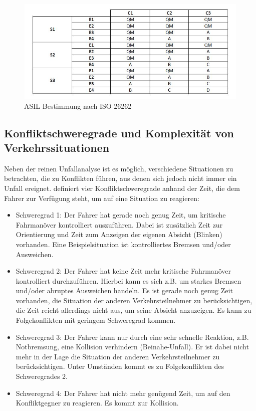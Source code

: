 \begin{savenotes}
	\begin{figure}[H]
		\centering
		\includegraphics[width=12cm,height=5cm]{figures/ISO_26262}
		\caption[ASIL Bestimmung nach ISO 26262]{ASIL Bestimmung nach ISO 26262 \parencite[S. 96]{Hillenbrand.2012}}\label{fig:ISO 26262}
	\end{figure}
\end{savenotes}

\subsection{Konfliktschweregrade und Komplexität von Verkehrssituationen}
Neben der reinen Unfallanalyse ist es möglich, verschiedene Situationen zu betrachten, die zu Konflikten führen, aus denen sich jedoch nicht immer ein Unfall ereignet. \Textcite[S. 28]{Erke.1978} definiert vier Konfliktschweregrade anhand der Zeit, die dem Fahrer zur Verfügung steht, um auf eine Situation zu reagieren:

\begin{itemize}
	\item Schweregrad 1: Der Fahrer hat gerade noch genug Zeit, um kritische Fahrmanöver kontrolliert auszuführen. Dabei ist zusätzlich Zeit zur Orientierung und Zeit zum Anzeigen der eigenen Absicht (Blinken) vorhanden. Eine Beispielsituation ist kontrolliertes Bremsen und/oder Ausweichen.
	\item Schweregrad 2: Der Fahrer hat keine Zeit mehr kritische Fahrmanöver kontrolliert durchzuführen. Hierbei kann es sich z.B. um starkes Bremsen und/oder abruptes Ausweichen handeln. Es ist gerade noch genug Zeit vorhanden, die Situation der anderen Verkehrsteilnehmer zu berücksichtigen, die Zeit reicht allerdings nicht aus, um seine Absicht anzuzeigen. Es kann zu Folgekonflikten mit geringem Schweregrad kommen.
	\item Schweregrad 3: Der Fahrer kann nur durch eine sehr schnelle Reaktion, z.B. Notbremsung, eine Kollision verhindern (Beinahe-Unfall). Er ist dabei nicht mehr in der Lage die Situation der anderen Verkehrsteilnehmer zu berücksichtigen. Unter Umständen kommt es zu Folgekonflikten des Schweregrades 2.
	\item Schweregrad 4: Der Fahrer hat nicht mehr genügend Zeit, um auf den Konfliktgegner zu reagieren. Es kommt zur Kollision.
\end{itemize}

